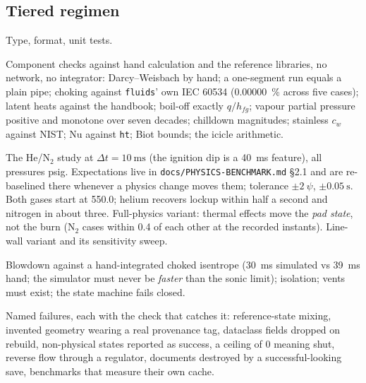 \documentclass[11pt,a4paper]{article}
\newcommand{\code}[1]{\texttt{#1}}
\begin{document}
\subsection{Tiered regimen}
\begin{description}[leftmargin=2em,style=nextline]
\item[Tier 0 --- gates] Type, format, unit tests.
\item[Tier 1 --- closed form] Component checks against hand calculation and the
  reference libraries, no network, no integrator: Darcy--Weisbach by hand; a
  one-segment run equals a plain pipe; choking against \code{fluids}' own IEC
  60534 (\SI{0.00000}{\percent} across five cases); latent heats against the
  handbook; boil-off exactly $q/h_{fg}$; vapour partial pressure positive and
  monotone over seven decades; chilldown magnitudes; stainless $c_w$ against
  NIST; $\mathrm{Nu}$ against \code{ht}; Biot bounds; the icicle arithmetic.
\item[Tier 2 --- integration] The He/N$_2$ study at $\Delta t=\SI{10}{\milli\second}$
  (the ignition dip is a \SI{40}{\milli\second} feature), all pressures psig.
  Expectations live in \code{docs/PHYSICS-BENCHMARK.md} \S2.1 and are
  re-baselined there whenever a physics change moves them; tolerance
  $\pm\SI{2}{\psi}$, $\pm\SI{0.05}{\second}$. Both gases start at
  \SI{550.0}{\psig}; helium recovers lockup within half a second and nitrogen
  in about three. Full-physics variant: thermal effects move the
  \emph{pad state}, not the burn (N$_2$ cases within \SI{0.4}{\psi} of each other
  at the recorded instants). Line-wall variant and its sensitivity sweep.
\item[Tier 3 --- venting and state machine] Blowdown against a hand-integrated
  choked isentrope (\SI{30}{\milli\second} simulated vs \SI{39}{\milli\second}
  hand; the simulator must never be \emph{faster} than the sonic limit);
  isolation; vents must exist; the state machine fails closed.
\item[Tier 4 --- the trap list] Named failures, each with the check that
  catches it: reference-state mixing, invented geometry wearing a real
  provenance tag, dataclass fields dropped on rebuild, non-physical states
  reported as success, a ceiling of $0$ meaning shut, reverse flow through a
  regulator, documents destroyed by a successful-looking save, benchmarks that
  measure their own cache.
\end{description}
\end{document}
